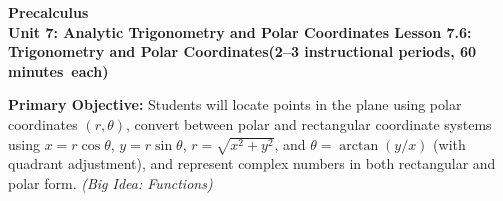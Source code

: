 \documentclass[10pt]{article}
\newcommand{\CourseName}{Precalculus}
\newcommand{\MeetingLength}{60 minutes}
\newcommand{\UnitNumberName}{Unit 7: Analytic Trigonometry and Polar Coordinates \quad}
\newcommand{\LessonNumberName}{Lesson 7.6: Trigonometry and Polar Coordinates}
\begin{document}
\begin{center}
  {\Large\bfseries \CourseName} \\[4pt]
  {\small\bfseries \UnitNumberName \LessonNumberName \quad (2--3 instructional periods, \MeetingLength\ each)}
\end{center}

\begin{tcolorbox}[colback=sky, colframe=navy, boxrule=0.9pt, arc=2mm,
    left=2mm, right=2mm, top=1.5mm, bottom=1.5mm]
  \textbf{Primary Objective:} Students will locate points in the plane using
  polar coordinates $(r,\theta)$, convert between polar and rectangular coordinate
  systems using $x = r\cos\theta$, $y = r\sin\theta$, $r = \sqrt{x^2+y^2}$, and
  $\theta = \arctan(y/x)$ (with quadrant adjustment), and represent complex numbers
  in both rectangular and polar form.
  \textit{(Big Idea: Functions)}
\end{tcolorbox}

\vspace{0.08in}
\end{document}
